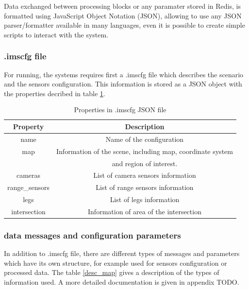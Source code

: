 Data exchanged between processing blocks or any paramater stored in Redis, is formatted using JavaScript Object Notation (JSON), allowing to use any JSON parser/formatter available in many languages, even it is possible to create simple scripts to interact with the system.

\subsubsection{.imscfg file}

For running, the systems requires first a .imscfg file which describes the scenario and the sensors configuration. This information is stored as a JSON object with the properties decribed in table \ref{imscfg_file}.

\begin{table}[ht!]
\footnotesize
\centering
\begin{tabular}{|c | c|}
\hline
\textbf{Property} & \textbf{Description} \\
\hline
name & Name of the configuration \\
\hline
map & Information of the scene, including map, coordinate system \\ 
 & and region of interest. \\
\hline
cameras & List of camera sensors information \\
\hline
range\_sensors & List of range sensors information \\
\hline
legs & List of legs information \\
\hline
intersection & Information of area of the intersection \\
\hline
\end{tabular}
\caption{Properties in .imscfg JSON file}
\label{imscfg_file}
\end{table}

\subsubsection{data messages and configuration parameters}

In addition to .imscfg file, there are different types of messages and parameters which have its own structure, for example used for sensors configuration or processed data. The table \ref{desc_map} gives a description of the types of information used. A more detailed documentation is given in appendix TODO.

